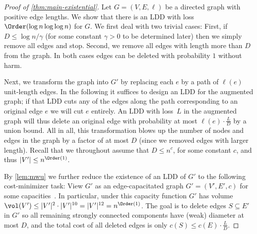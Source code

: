 \begin{proof}[Proof of \cref{thm:main-existential}]
Let $G = (V, E, \ell)$ be a directed graph with positive edge lengths. We show that there is an LDD with loss $\Order(\log n \log\log n)$ for $G$. We first deal with two trivial cases: First, if $D \leq \log n / \gamma$ (for some constant $\gamma > 0$ to be determined later) then we simply remove all edges and stop. Second, we remove all edges with length more than $D$ from the graph. In both cases edges can be deleted with probability $1$ without harm.

Next, we transform the graph into $G'$ by replacing each $e$ by a path of $\ell(e)$ unit-length edges. In the following it suffices to design an LDD for the augmented graph; if that LDD cuts any of the edges along the path corresponding to an original edge $e$ we will cut $e$ entirely. An LDD with loss~$L$ in the augmented graph will thus delete an original edge with probability at most $\ell(e) \cdot \frac{L}{D}$ by a union bound. All in all, this transformation blows up the number of nodes and edges in the graph by a factor of at most $D$ (since we removed edges with larger length). Recall that we throughout assume that $D \leq n^c$, for some constant $c$, and thus $|V'| \leq n^{\Order(1)}$.

By \cref{lem:mwu} we further reduce the existence of an LDD of $G'$ to the following cost-minimizer task: View $G'$ as an edge-capacitated graph $G' = (V', E', c)$ for some capacities~. In particular, under this capacity function $G'$ has volume $\vol(V') \leq |V'|^2 \cdot |V'|^{10} = |V'|^{12} = n^{\Order(1)}$. The goal is to delete edges $S \subseteq E'$ in $G'$ so all remaining strongly connected components have (weak) diameter at most $D$, and the total cost of all deleted edges is only $c(S) \leq c(E) \cdot \frac{L}{D}$.


\end{proof}
